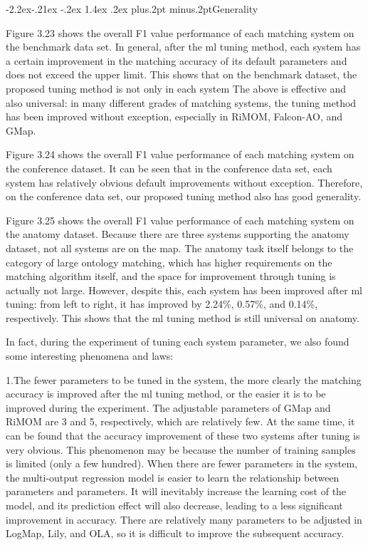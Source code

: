 \documentclass[twoside]{article}
\makeatletter
\def\subsection{\@startsection{subsection}{2}{\z@}%
 {-3ex\@plus -.2ex \@minus -.2ex}%
 {2ex \@plus.2ex}%
{\normalfont\normalsize\protect\baselineskip=12.5pt plus.2pt minus.2pt\bfseries}}
\def\subsubsection{\@startsection{subsubsection}{3}{\z@}%
 {-2.2ex\@plus -.21ex \@minus -.2ex}%
 {1.4ex \@plus.2ex}
{\normalfont\normalsize\protect\baselineskip=12pt plus.2pt minus.2pt\sl}}
\makeatother
\begin{document}



\subsubsection{Generality}

Figure 3.23 shows the overall F1 value performance of each matching system on the benchmark data set.
In general, after the ml tuning method, each system has a certain improvement in the matching accuracy of its default parameters and does not exceed the upper limit. This shows that on the benchmark dataset, the proposed tuning method is not only in each system The above is effective and also universal: in many different grades of matching systems, the tuning method has been improved without exception, especially in RiMOM, Falcon-AO, and GMap.

Figure 3.24 shows the overall F1 value performance of each matching system on the conference dataset.
It can be seen that in the conference data set, each system has relatively obvious default improvements without exception. Therefore, on the conference data set, our proposed tuning method also has good generality.

Figure 3.25 shows the overall F1 value performance of each matching system on the anatomy dataset.
Because there are three systems supporting the anatomy dataset, not all systems are on the map.
The anatomy task itself belongs to the category of large ontology matching, which has higher requirements on the matching algorithm itself, and the space for improvement through tuning is actually not large.
However, despite this, each system has been improved after ml tuning: from left to right, it has improved by 2.24\%, 0.57\%, and 0.14\%, respectively. This shows that the ml tuning method is still universal on anatomy.

In fact, during the experiment of tuning each system parameter, we also found some interesting phenomena and laws:

1.The fewer parameters to be tuned in the system, the more clearly the matching accuracy is improved after the ml tuning method, or the easier it is to be improved during the experiment.
The adjustable parameters of GMap and RiMOM are 3 and 5, respectively, which are relatively few. At the same time, it can be found that the accuracy improvement of these two systems after tuning is very obvious.
This phenomenon may be because the number of training samples is limited (only a few hundred). When there are fewer parameters in the system, the multi-output regression model is easier to learn the relationship between parameters and parameters. It will inevitably increase the learning cost of the model, and its prediction effect will also decrease, leading to a less significant improvement in accuracy. There are relatively many parameters to be adjusted in LogMap, Lily, and OLA, so it is difficult to improve the subsequent accuracy.
\end{document}
